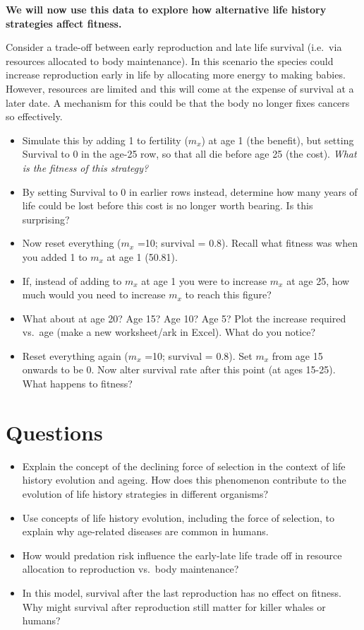 \documentclass[
  a4paper]{book}
\providecommand{\tightlist}{%
  \setlength{\itemsep}{0pt}\setlength{\parskip}{0pt}}
\begin{document}
\textbf{We will now use this data to explore how alternative life history strategies affect fitness.}

Consider a trade-off between early reproduction and late life survival (i.e.~via resources allocated to body maintenance). In this scenario the species could increase reproduction early in life by allocating more energy to making babies. However, resources are limited and this will come at the expense of survival at a later date. A mechanism for this could be that the body no longer fixes cancers so effectively.

\begin{itemize}
\item
  Simulate this by adding 1 to fertility (\(m_x\)) at age 1 (the benefit), but setting Survival to 0 in the age-25 row, so that all die before age 25 (the cost). \emph{What is the fitness of this strategy?}
\item
  By setting Survival to 0 in earlier rows instead, determine how many years of life could be lost before this cost is no longer worth bearing. Is this surprising?
\item
  Now reset everything (\(m_x\) =10; survival = 0.8). Recall what fitness was when you added 1 to \(m_x\) at age 1 (50.81).
\item
  If, instead of adding to \(m_x\) at age 1 you were to increase \(m_x\) at age 25, how much would you need to increase \(m_x\) to reach this figure?
\item
  What about at age 20? Age 15? Age 10? Age 5?
  Plot the increase required vs.~age (make a new worksheet/ark in Excel). What do you notice?
\item
  Reset everything again (\(m_x\) =10; survival = 0.8). Set \(m_x\) from age 15 onwards to be 0. Now alter survival rate after this point (at ages 15-25). What happens to fitness?
\end{itemize}

\section{Questions}\label{questions-10}

\begin{itemize}
\tightlist
\item
  Explain the concept of the declining force of selection in the context of life history evolution and ageing. How does this phenomenon contribute to the evolution of life history strategies in different organisms?
\item
  Use concepts of life history evolution, including the force of selection, to explain why age-related diseases are common in humans.
\item
  How would predation risk influence the early-late life trade off in resource allocation to reproduction vs.~body maintenance?
\item
  In this model, survival after the last reproduction has no effect on fitness. Why might survival after reproduction still matter for killer whales or humans?
\end{itemize}
\end{document}
